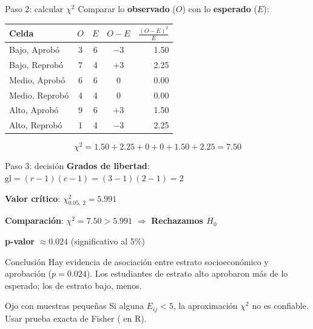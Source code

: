 \documentclass[aspectratio=169, 11pt]{beamer}
\begin{document}
\begin{frame}{Paso 2: calcular $\chi^2$}
\small
Comparar lo \textbf{observado} ($O$) con lo \textbf{esperado} ($E$):

\vspace{0.2cm}
\begin{center}
\footnotesize
\begin{tabular}{lcccr}
\toprule
Celda & $O$ & $E$ & $O - E$ & $\frac{(O-E)^2}{E}$ \\
\midrule
Bajo, Aprobó & 3 & 6 & $-3$ & 1.50 \\
Bajo, Reprobó & 7 & 4 & $+3$ & 2.25 \\
Medio, Aprobó & 6 & 6 & 0 & 0.00 \\
Medio, Reprobó & 4 & 4 & 0 & 0.00 \\
Alto, Aprobó & 9 & 6 & $+3$ & 1.50 \\
Alto, Reprobó & 1 & 4 & $-3$ & 2.25 \\
\bottomrule
\end{tabular}
\end{center}

\vspace{0.2cm}
\[
\chi^2 = 1.50 + 2.25 + 0 + 0 + 1.50 + 2.25 = \boxed{7.50}
\]
\end{frame}

\begin{frame}{Paso 3: decisión}
\small
\textbf{Grados de libertad}: $\text{gl} = (r-1)(c-1) = (3-1)(2-1) = 2$

\vspace{0.2cm}
\textbf{Valor crítico}: $\chi^2_{0.05,\,2} = 5.991$

\vspace{0.2cm}
\textbf{Comparación}: $\chi^2 = 7.50 > 5.991$ $\Rightarrow$ \textbf{Rechazamos $H_0$}

\vspace{0.2cm}
\textbf{p-valor} $\approx 0.024$ (significativo al 5\%)

\vspace{0.3cm}
\begin{alertblock}{Conclusión}
Hay evidencia de asociación entre estrato socioeconómico y aprobación ($p = 0.024$). Los estudiantes de estrato alto aprobaron más de lo esperado; los de estrato bajo, menos.
\end{alertblock}

\begin{exampleblock}{Ojo con muestras pequeñas}
\small Si alguna $E_{ij} < 5$, la aproximación $\chi^2$ no es confiable. Usar prueba exacta de Fisher ( en R).
\end{exampleblock}
\end{frame}
\end{document}
